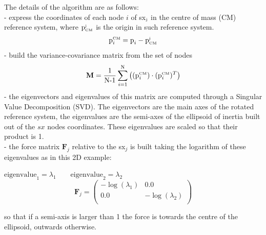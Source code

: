 \documentclass[10pt,a4paper]{book}
\begin{document}
\begin{itemize}
  The details of the algorithm are as follows:\\
  - express the coordinates of each node $i$ of sx$_{\textrm{\tiny
      j}}$ in the centre of mass (CM) reference system, where $\textrm{p}^{\textrm{\tiny
        j}}_{\textrm{\tiny CM}}$ is the origin in such reference system.
 \begin{equation}
    \textrm{p}^{\textrm{\tiny CM}}_{\tiny i} =
    \textrm{p}_{\tiny i} - \textrm{p}^{\textrm{\tiny
        j}}_{\textrm{\tiny CM}}
  \end{equation}
  - build the variance-covariance matrix from the set of nodes
  \begin{equation}
    \mathbf{M} = \frac{1}{\textrm{N-1}}\sum_{i=1}^\textrm{N} \left(
      (\textrm{p}^{\textrm{\tiny CM}}_{\tiny i})
      \cdot (\textrm{p}^{\textrm{\tiny CM}}_{\tiny i})^T \right)
  \end{equation}
  - the eigenvectors and eigenvalues of this matrix are computed
  through a Singular Value Decomposition (SVD). The eigenvectors 
  are the main axes of the rotated reference system, the eigenvalues
  are the semi-axes of the ellipsoid of inertia built out of the $sx$ nodes coordinates. 
  These eigenvalues are scaled so that their product is 1. \\
  - the force matrix $\textbf{F}_j$ relative to the sx$_j$ is
  built taking the logarithm of these 
  eigenvalues as in this 2D example: \\
  \begin{center}
    $\textrm{eigenvalue}_1 = \lambda_1 \qquad \textrm{eigenvalue}_2 = \lambda_2$   \\
    \begin{displaymath}
      \mathbf{F}_j =
      \left( \begin{array}{ccc}
           -\log (\lambda_1) & 0.0 \\
          0.0 & -\log (\lambda_2)  \\
        \end{array} \right)
    \end{displaymath}
  \end{center}
  so that if a semi-axis is larger than 1 the force is towards
  the centre of the ellipsoid, outwards otherwise.


\end{itemize}
\end{document}
